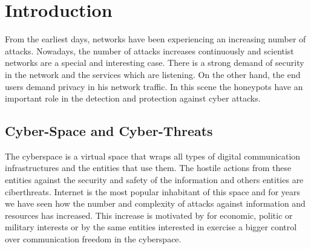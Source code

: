 \documentclass[a4paper]{llncs}
\begin{document}
\section{Introduction}

From the earliest days, %
  networks have been experiencing an increasing number of
  attacks. Nowadays, %
 the number of attacks increases continuously and scientist networks
 are a special and interesting case. %
 There is a strong demand of security in the network and the services which are listening. On the other hand, the end users demand privacy in his network traffic. In this scene the honeypots have an important role in the detection and protection against cyber attacks.


\subsection{Cyber-Space and Cyber-Threats}
\label{sect:Scientist Networks}

The cyberspace is a virtual space that wraps all types of digital
communication  infrastructures and the entities that use them. The
hostile actions from these entities against the security and safety of the information and others entities are ciberthreats. Internet is the most popular inhabitant of this space and for years we have seen how
the number and complexity of attacks against information and resources has increased. This increase is motivated by for economic, politic or military interests or by the same entities interested in exercise a bigger control over communication freedom in the cyberspace.  %
\end{document}
